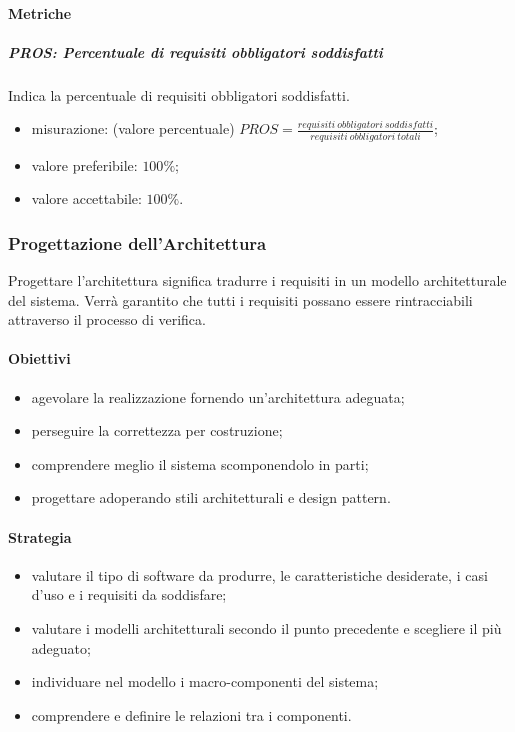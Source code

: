 		\paragraph{Metriche}
			\subparagraph{PROS: Percentuale di requisiti obbligatori soddisfatti} Indica la percentuale di requisiti obbligatori soddisfatti.
			\begin{itemize}
				\item misurazione: (valore percentuale) $ PROS = \frac{requisiti\ obbligatori\ soddisfatti}{requisiti\ obbligatori\ totali}$;
				\item valore preferibile: $100\%$;
				\item valore accettabile: $100\%$.
			\end{itemize}
	
			
	\subsubsection{Progettazione dell'Architettura}
	Progettare l'architettura significa tradurre i requisiti in un modello architetturale del sistema. Verrà garantito che tutti i requisiti possano essere rintracciabili attraverso il processo di verifica.
	\paragraph{Obiettivi}
	\begin{itemize}
		\item agevolare la realizzazione fornendo un'architettura adeguata;
		\item perseguire la correttezza per costruzione;
		\item comprendere meglio il sistema scomponendolo in parti;
		\item progettare adoperando stili architetturali e design pattern.
	\end{itemize}
	\paragraph{Strategia}
	\begin{itemize}
		\item valutare il tipo di software da produrre, le caratteristiche desiderate, i casi d'uso e i requisiti da soddisfare;
		\item valutare i modelli architetturali secondo il punto precedente e scegliere il più adeguato;
		\item individuare nel modello i macro-componenti del sistema;
		\item comprendere e definire le relazioni tra i componenti.
	\end{itemize}
